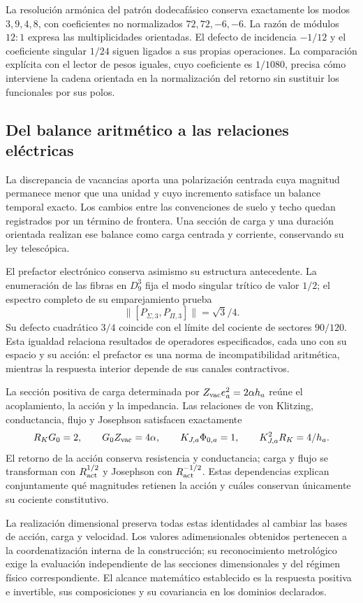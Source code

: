 La resolución armónica del patrón dodecafásico conserva exactamente
los modos $3,9,4,8$, con coeficientes no normalizados $72,72,-6,-6$.
La razón de módulos $12:1$ expresa las multiplicidades orientadas.
El defecto de incidencia $-1/12$ y el coeficiente singular $1/24$
siguen ligados a sus propias operaciones. La comparación explícita
con el lector de pesos iguales, cuyo coeficiente es $1/1080$,
precisa cómo interviene la cadena orientada en la normalización
del retorno sin sustituir los funcionales por sus polos.

\subsection*{Del balance aritmético a las relaciones eléctricas}

La discrepancia de vacancias aporta una polarización centrada cuya
magnitud permanece menor que una unidad y cuyo incremento satisface
un balance temporal exacto. Los cambios entre las convenciones de
suelo y techo quedan registrados por un término de frontera. Una
sección de carga y una duración orientada realizan ese balance como
carga centrada y corriente, conservando su ley telescópica.

El prefactor electrónico conserva asimismo su estructura antecedente.
La enumeración de las fibras en $D_9^3$ fija el modo singular trítico
de valor $1/2$; el espectro completo de su emparejamiento prueba
\[
\|[P_{\Sigma,3},P_{\Pi,3}]\|=\sqrt3/4.
\]
Su defecto cuadrático $3/4$ coincide con el límite del cociente de
sectores $90/120$. Esta igualdad relaciona resultados de operadores
especificados, cada uno con su espacio y su acción: el prefactor es
una norma de incompatibilidad aritmética, mientras la respuesta
interior depende de sus canales contractivos.

La sección positiva de carga determinada por
$Z_{\rm vac}e_a^2=2\alpha h_a$ reúne el acoplamiento, la acción y
la impedancia. Las relaciones de von Klitzing, conductancia, flujo
y Josephson satisfacen exactamente
\[
R_KG_0=2,\qquad G_0Z_{\rm vac}=4\alpha,\qquad
K_{J,a}\Phi_{0,a}=1,\qquad K_{J,a}^2R_K=4/h_a.
\]
El retorno de la acción conserva resistencia y conductancia; carga y
flujo se transforman con $R_{\rm act}^{1/2}$ y Josephson con
$R_{\rm act}^{-1/2}$. Estas dependencias explican conjuntamente
qué magnitudes retienen la acción y cuáles conservan únicamente su
cociente constitutivo.

La realización dimensional preserva todas estas identidades al
cambiar las bases de acción, carga y velocidad. Los valores
adimensionales obtenidos pertenecen a la coordenatización interna de la
construcción; su reconocimiento metrológico exige la evaluación
independiente de las secciones dimensionales y del régimen físico
correspondiente. El alcance matemático establecido es la respuesta
positiva e invertible, sus composiciones y su covariancia en los
dominios declarados.

